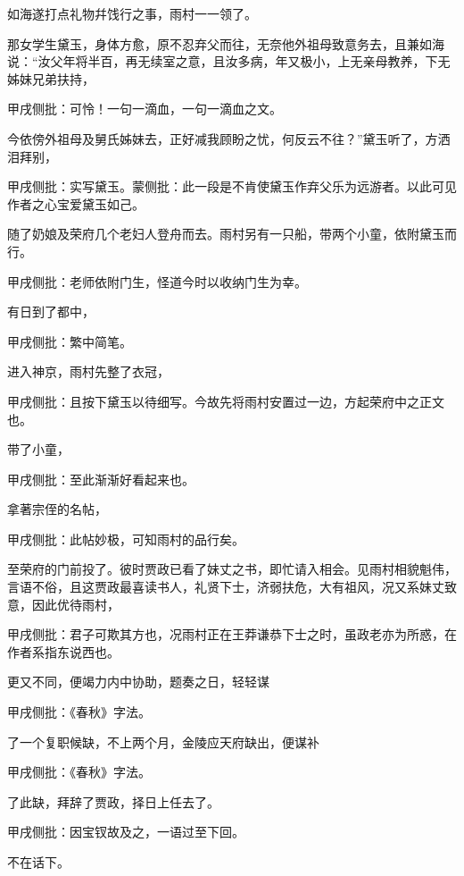 \begin{parag}
    如海遂打点礼物幷饯行之事，雨村一一领了。
\end{parag}


\begin{parag}
    那女学生黛玉，身体方愈，原不忍弃父而往，无奈他外祖母致意务去，且兼如海说：“汝父年将半百，再无续室之意，且汝多病，年又极小，上无亲母教养，下无姊妹兄弟扶持，\begin{note}甲戌侧批：可怜！一句一滴血，一句一滴血之文。\end{note}今依傍外祖母及舅氏姊妹去，正好减我顾盼之忧，何反云不往？”黛玉听了，方洒泪拜别，\begin{note}甲戌侧批：实写黛玉。蒙侧批：此一段是不肯使黛玉作弃父乐为远游者。以此可见作者之心宝爱黛玉如己。\end{note}随了奶娘及荣府几个老妇人登舟而去。雨村另有一只船，带两个小童，依附黛玉而行。\begin{note}甲戌侧批：老师依附门生，怪道今时以收纳门生为幸。\end{note}
\end{parag}


\begin{parag}
    有日到了都中，\begin{note}甲戌侧批：繁中简笔。\end{note}进入神京，雨村先整了衣冠，\begin{note}甲戌侧批：且按下黛玉以待细写。今故先将雨村安置过一边，方起荣府中之正文也。\end{note}带了小童，\begin{note}甲戌侧批：至此渐渐好看起来也。\end{note}拿著宗侄的名帖，\begin{note}甲戌侧批：此帖妙极，可知雨村的品行矣。\end{note}至荣府的门前投了。彼时贾政已看了妹丈之书，即忙请入相会。见雨村相貌魁伟，言语不俗，且这贾政最喜读书人，礼贤下士，济弱扶危，大有祖风，况又系妹丈致意，因此优待雨村，\begin{note}甲戌侧批：君子可欺其方也，况雨村正在王莽谦恭下士之时，虽政老亦为所惑，在作者系指东说西也。\end{note}更又不同，便竭力内中协助，题奏之日，轻轻谋\begin{note}甲戌侧批：《春秋》字法。\end{note}了一个复职候缺，不上两个月，金陵应天府缺出，便谋补\begin{note}甲戌侧批：《春秋》字法。\end{note}了此缺，拜辞了贾政，择日上任去了。\begin{note}甲戌侧批：因宝钗故及之，一语过至下回。\end{note}不在话下。
\end{parag}



